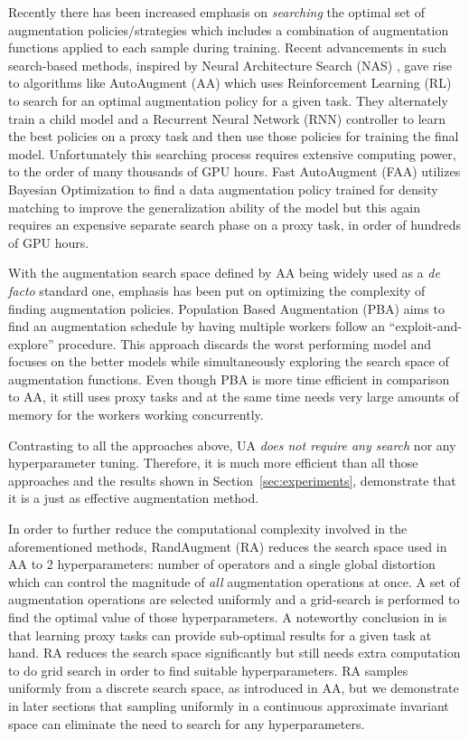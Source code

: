 \documentclass[runningheads]{llncs}
\begin{document}
	Recently there has been increased emphasis on \emph{searching} the optimal set of augmentation policies/strategies which includes a combination of augmentation functions applied to each sample during training. Recent advancements in such search-based methods, inspired by Neural Architecture Search (NAS) \cite{zoph2016neural}, gave rise to algorithms like AutoAugment (AA) \cite{cubuk2019autoaugment} which uses Reinforcement Learning (RL) to search for an optimal augmentation policy for a given task. They alternately train a child model and a Recurrent Neural Network (RNN) controller to learn the best policies on a proxy task and then use those policies for training the final model. Unfortunately this searching process requires extensive computing power, to the order of many thousands of GPU hours. Fast AutoAugment (FAA) \cite{lim2019fast} utilizes Bayesian Optimization to find a data augmentation policy trained for density matching to improve the generalization ability of the model but this again requires an expensive separate search phase on a proxy task, in order of hundreds of GPU hours.
	
	With the augmentation search space defined by AA being widely used as a \emph{de facto} standard one, emphasis has been put on optimizing the complexity of  finding augmentation policies. Population Based Augmentation (PBA) \cite{ho2019population} aims to find an augmentation schedule by having multiple workers follow an ``exploit-and-explore'' procedure.  This approach discards the worst performing model and focuses on the better models while simultaneously exploring the search space of augmentation functions. Even though PBA is more time efficient in comparison to AA, it still uses proxy tasks and at the same time needs very large amounts of memory for the workers working concurrently. 

	Contrasting to all the approaches above, UA \emph{does not require any search} nor any hyperparameter tuning. Therefore, it is much more efficient than all those approaches and the results shown in Section~\ref{sec:experiments}, demonstrate that it is a just as effective augmentation method.
	
	In order to further reduce the computational complexity involved in the aforementioned methods, RandAugment (RA) \cite{cubuk2019randaugment} reduces the search space used in AA to 2 hyperparameters: number of operators and a single global distortion which can control the magnitude of \emph{all} augmentation operations at once. A set of augmentation operations are selected uniformly 
	and a grid-search is performed to find the optimal value of those hyperparameters.  
	A noteworthy conclusion in  \cite{cubuk2019randaugment} is that learning proxy tasks can provide sub-optimal results for a given task at hand. RA reduces the search space significantly but still needs extra computation to do grid search in order to find suitable hyperparameters. RA samples uniformly from a discrete search space, as introduced in AA, but we demonstrate in later sections that sampling uniformly in a continuous approximate invariant space can eliminate the need to search for any hyperparameters.   
	
\end{document}

